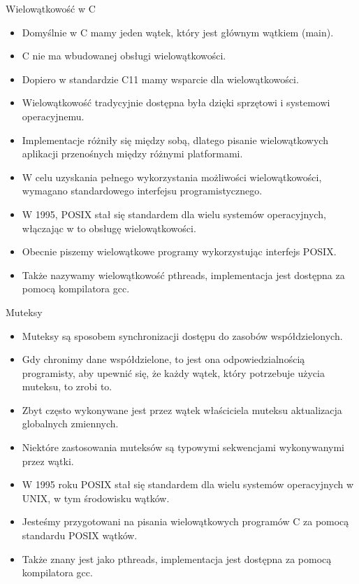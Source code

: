 \documentclass[notheorems, aspectratio=54]{beamer}
\begin{document}
\begin{frame}
Wielowątkowość w C
\begin{itemize}
\item Domyślnie w C mamy jeden wątek, który jest głównym wątkiem (main).
\item C nie ma wbudowanej obsługi wielowątkowości.
\item Dopiero w standardzie C11 mamy wsparcie dla wielowątkowości.
\item Wielowątkowość tradycyjnie dostępna była dzięki sprzętowi i systemowi operacyjnemu.
\item Implementacje różniły się między sobą, dlatego pisanie wielowątkowych aplikacji przenośnych między różnymi platformami.
\item W celu uzyskania pełnego wykorzystania możliwości wielowątkowości, wymagano standardowego interfejsu programistycznego. 
\item W 1995, POSIX stał się standardem dla wielu systemów operacyjnych, włączając w to obsługę wielowątkowości.
\item Obecnie piszemy wielowątkowe programy wykorzystując interfejs POSIX.
\item Także nazywamy wielowątkowość pthreads, implementacja jest dostępna za pomocą kompilatora gcc. 
\end{itemize}

\end{frame}

\begin{frame}
Muteksy
\begin{itemize}
\item Muteksy są sposobem synchronizacji dostępu do zasobów współdzielonych.
\item Gdy chronimy dane współdzielone, to jest ona odpowiedzialnością programisty, aby upewnić się, że każdy wątek, który potrzebuje użycia muteksu, to zrobi to.
\item Zbyt często wykonywane jest przez wątek właściciela muteksu aktualizacja globalnych zmiennych.
\item Niektóre zastosowania muteksów są typowymi sekwencjami wykonywanymi przez wątki.
\item W 1995 roku POSIX stał się standardem dla wielu systemów operacyjnych w UNIX, w tym środowisku wątków.
\item Jesteśmy przygotowani na pisania wielowątkowych programów C za pomocą standardu POSIX wątków.
\item Także znany jest jako pthreads, implementacja jest dostępna za pomocą kompilatora gcc.
\end{itemize}

\end{frame}
\end{document}
